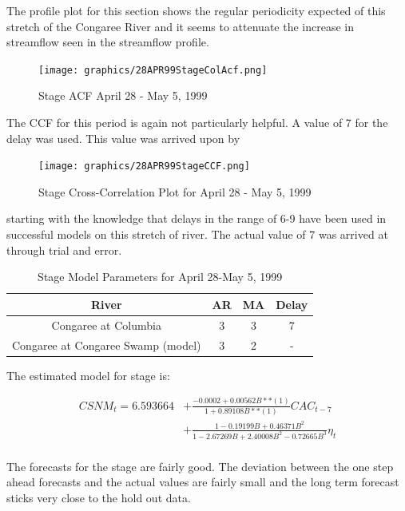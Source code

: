 \documentclass[12pt]{report}
\begin{document}
The profile plot for this section shows the regular periodicity
expected of this stretch of the Congaree River and it seems to
attenuate the increase in streamflow seen in the streamflow
profile.


\begin{figure}[h]
\centering\texttt{[image: graphics/28APR99StageColAcf.png]}
\centering\caption{Stage ACF April 28 - May 5, 1999}
\end{figure}


The CCF for this period is again not particularly helpful. A value
of 7 for the delay was used. This value was arrived upon by
\begin{figure}[h]
\centering\texttt{[image: graphics/28APR99StageCCF.png]}
\centering\caption{Stage Cross-Correlation Plot for April 28 - May
5, 1999}
\end{figure}
starting with the knowledge that delays in the range of 6-9 have
been used in successful models on this stretch of river.  The
actual value of 7 was arrived at through trial and error.

\begin{table}[h]
\begin{centering}\begin{tabular}{|c|c|c|c|}
\hline \textbf{River} & \textbf{AR} & \textbf{MA} & \textbf{Delay} \\
\hline Congaree at Columbia & 3 & 3 & 7 \\
Congaree at Congaree Swamp (model) & 3 & 2 & - \\
\hline
\end{tabular}\caption{Stage Model Parameters for April 28-May 5,
1999}
\end{centering}\end{table}

The estimated model for stage is:

\begin{equation}\begin{split}
\label{eq:28aprstagemodel} CSNM_t=6.593664&+\frac{ -0.0002 +
0.00562 B**(1) }{1 + 0.89108 B**(1) }CAC_{t-7}\\
&+\frac{1-0.19199B+0.46371B^2}{1-2.67269B+2.40008B^2-0.72665
B^3}\eta_t\\
\end{split}
\end{equation}

The forecasts for the stage are fairly good.  The deviation
between the one step ahead forecasts and the actual values are
fairly small and the long term forecast sticks very close to the
hold out data.
\end{document}
